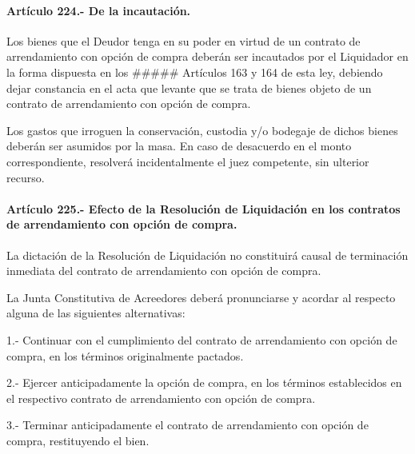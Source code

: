 \documentclass[
]{book}
\begin{document}
\hypertarget{artuxedculo-224.--de-la-incautaciuxf3n.}{%
\paragraph*{Artículo 224.- De la incautación.}\label{artuxedculo-224.--de-la-incautaciuxf3n.}}

Los bienes que el Deudor tenga en su poder en virtud de un contrato de arrendamiento con opción de compra deberán ser incautados por el Liquidador en la forma dispuesta en los \#\#\#\#\# Artículos 163 y 164 de esta ley, debiendo dejar constancia en el acta que levante que se trata de bienes objeto de un contrato de arrendamiento con opción de compra.

Los gastos que irroguen la conservación, custodia y/o bodegaje de dichos bienes deberán ser asumidos por la masa. En caso de desacuerdo en el monto correspondiente, resolverá incidentalmente el juez competente, sin ulterior recurso.

\hypertarget{artuxedculo-225.--efecto-de-la-resoluciuxf3n-de-liquidaciuxf3n-en-los-contratos-de-arrendamiento-con-opciuxf3n-de-compra.}{%
\paragraph*{Artículo 225.- Efecto de la Resolución de Liquidación en los contratos de arrendamiento con opción de compra.}\label{artuxedculo-225.--efecto-de-la-resoluciuxf3n-de-liquidaciuxf3n-en-los-contratos-de-arrendamiento-con-opciuxf3n-de-compra.}}

La dictación de la Resolución de Liquidación no constituirá causal de terminación inmediata del contrato de arrendamiento con opción de compra.

La Junta Constitutiva de Acreedores deberá pronunciarse y acordar al respecto alguna de las siguientes alternativas:

1.- Continuar con el cumplimiento del contrato de arrendamiento con opción de compra, en los términos originalmente pactados.

2.- Ejercer anticipadamente la opción de compra, en los términos establecidos en el respectivo contrato de arrendamiento con opción de compra.

3.- Terminar anticipadamente el contrato de arrendamiento con opción de compra, restituyendo el bien.
\end{document}
